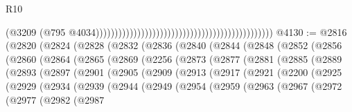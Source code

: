 \begin{lexlean}{R10}
\begin{coremodule}
                                                                                              (@3209
                                                                                                (@795
                                                                                                  @4034)))))))))))))))))))))))))))))))))))))))))))))))
@4130 := @2816
    (@2820
      (@2824
        (@2828
          (@2832
            (@2836
              (@2840
                (@2844
                  (@2848
                    (@2852
                      (@2856
                        (@2860
                          (@2864
                            (@2865
                              (@2869
                                (@2256
                                  (@2873
                                    (@2877
                                      (@2881
                                        (@2885
                                          (@2889
                                            (@2893
                                              (@2897
                                                (@2901
                                                  (@2905
                                                    (@2909
                                                      (@2913
                                                        (@2917
                                                          (@2921
                                                            (@2200
                                                              (@2925
                                                                (@2929
                                                                  (@2934
                                                                    (@2939
                                                                      (@2944
                                                                        (@2949
                                                                          (@2954
                                                                            (@2959
                                                                              (@2963
                                                                                (@2967
                                                                                  (@2972
                                                                                    (@2977
                                                                                      (@2982
                                                                                        (@2987

\end{coremodule}
\end{lexlean}

